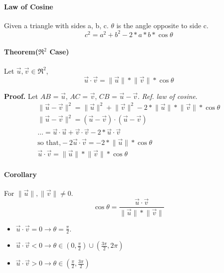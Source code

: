 \documentclass{article}
\begin{document}
	\paragraph{Law of Cosine} Given a triangle with sides a, b, c. $\theta$ is the angle opposite to side c. \[ c^2 = a^2 + b^2 - 2 * a * b * \cos{\theta} \]
	\paragraph{Theorem($\Re^2$ Case)} Let $\vec{u},\vec{v} \in \Re^2$,\[\vec{u} \cdot \vec{v} = \lVert \vec{u} \rVert * \lVert \vec{v} \rVert * \cos{\theta} \]
	\begin{figure}
		\centering
		\caption{}
	\end{figure}
	\newline \textbf{Proof.}
	\newline \quad Let $AB$ = $\vec{u}$, $AC$ = $\vec{v}$, $CB$ = $\vec{u} - \vec{v}$.
	\newline \quad \emph{Ref. law of cosine}.
	\begin{gather}
		\lVert \vec{u} - \vec{v} \rVert^2 = \lVert \vec{u} \rVert^2 + \lVert \vec{v} \rVert^2 - 2 * \lVert \vec{u} \rVert * \lVert \vec{v} \rVert * \cos{\theta} \\
		\lVert \vec{u} - \vec{v} \rVert^2 = (\vec{u} - \vec{v}) \cdot (\vec{u} - \vec{v}) \\ 
		\dots = \vec{u} \cdot \vec{u} + \vec{v} \cdot \vec{v} - 2 * \vec{u} \cdot \vec{v} \\ 
		\text{so that,} -2 \vec{u} \cdot \vec{v} = -2 * \lVert \vec{u} \rVert * \cos{\theta} \\ 
		\vec{u} \cdot \vec{v} = \lVert \vec{u} \rVert * \lVert \vec{v} \rVert * \cos{\theta}
	\end{gather}
	
	\paragraph{Corollary} For $\lVert \vec{u} \rVert, \lVert \vec{v} \rVert \neq 0$.
	\[
		\cos{\theta} = \frac{\vec{u} \cdot \vec{v}}{\lVert \vec{u} \rVert * \lVert \vec{v} \rVert}
	\]
	\begin{itemize}
		\item $\vec{u} \cdot \vec{v} = 0 \rightarrow \theta = \frac{\pi}{2}$.
		\item $\vec{u} \cdot \vec{v} < 0 \rightarrow \theta \in (0,\frac{\pi}{2}) \cup (\frac{3\pi}{2},2\pi)$
		\item $\vec{u} \cdot \vec{v} > 0 \rightarrow \theta \in (\frac{\pi}{2},\frac{3\pi}{2})$
	\end{itemize}
\end{document}
